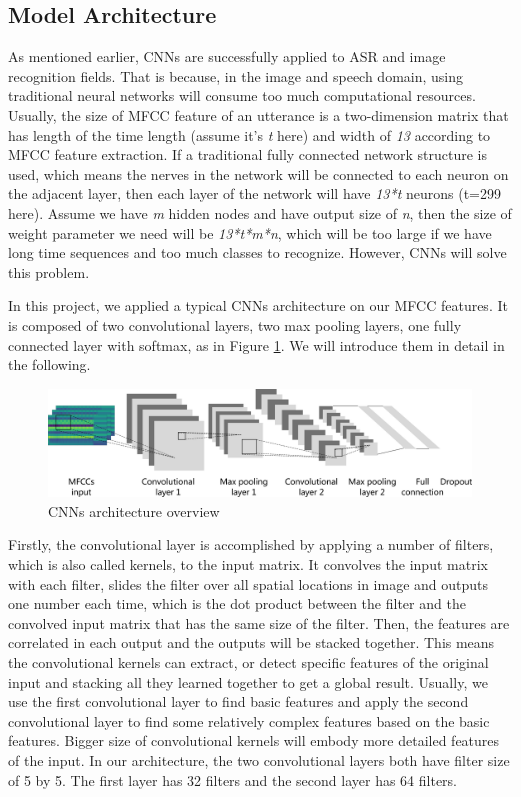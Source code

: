 \documentclass{article}
\begin{document}
\subsection{Model Architecture}

As mentioned earlier, CNNs are successfully applied to ASR and image recognition fields. That is because, in the image and speech domain, using traditional neural networks will consume too much computational resources. Usually, the size of MFCC feature of an utterance is a two-dimension matrix that has length of the time length (assume it's \emph{t} here) and width of \emph{13} according to MFCC feature extraction. If a traditional fully connected network structure is used, which means the nerves in the network will be connected to each neuron on the adjacent layer, then each  layer of the network will have \emph{13*t} neurons (t=299 here). Assume we have \emph{m} hidden nodes and have output size of \emph{n}, then the size of weight parameter we need will be \emph{13*t*m*n}, which will be too large if we have long time sequences and too much classes to recognize. However, CNNs will solve this problem.

In this project, we applied a typical CNNs architecture on our MFCC features. It is composed of two convolutional layers, two max pooling layers, one fully connected layer with softmax, as in Figure \ref{fig:cnn}. We will introduce them in detail in the following.

\begin{figure}[h!]
\centering
\includegraphics[width=\textwidth]{cnnarchitecture.png}
\caption{CNNs architecture overview}
\label{fig:cnn}
\end{figure}

Firstly, the convolutional layer is accomplished by applying a number of filters, which is also called kernels, to the input matrix. It convolves the input matrix with each filter, slides the filter over all spatial locations in image and outputs one number each time, which is the dot product between the filter and the convolved input matrix that has the same size of the filter. Then, the features are correlated in each output and the outputs will be stacked together. This means the convolutional kernels can extract, or detect specific features of the original input and stacking all they learned together to get a global result. Usually, we use the first convolutional layer to find basic features and apply the second convolutional layer to find some relatively complex features based on the basic features. Bigger size of convolutional kernels will embody more detailed features of the input. In our architecture, the two convolutional layers both have filter size of 5 by 5. The first layer has 32 filters and the second layer has 64 filters.
\end{document}
